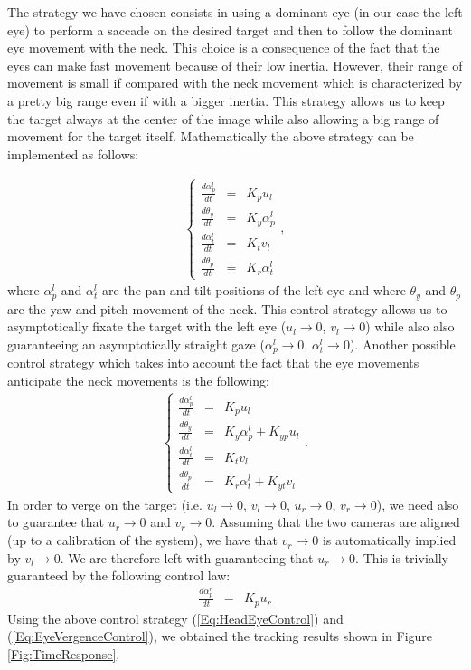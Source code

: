 The strategy we have chosen consists in using a dominant eye (in our case the left eye) to perform a saccade on the desired target and then to follow the dominant eye movement with the neck. This choice is a consequence of the fact that the eyes can make fast movement because of their low inertia. However, their range of movement is small if compared with the neck movement which is characterized by a pretty big range even if with a bigger inertia. This strategy allows us to keep the target always at the center of the image while also allowing a big range of movement for the target itself. Mathematically the above strategy can be implemented as follows:

\begin{eqnarray} 
\left\{ \begin{matrix}
\frac{d \alpha_p^l}{ d t} &=&   K_p u_l\\
\frac{d \theta_y}{ d t} &=&   K_y \alpha_p^l \\
\frac{d \alpha_t^l} {d t} &=&   K_t v_l\\
\frac{d \theta_p} {d t} &=&   K_r \alpha_t^l
\end{matrix} \right.,
\end{eqnarray}
where $\alpha_p^l$ and $\alpha_t^l$ are the pan and tilt positions of the left eye and where $\theta_y$ and $\theta_p$ are the yaw and pitch movement of the neck. This control strategy allows us to asymptotically fixate the target with the left eye ($u_l \rightarrow 0$, $v_l \rightarrow 0$) while also also guaranteeing an asymptotically  straight gaze ($\alpha_p^l \rightarrow 0$, $\alpha_t^l \rightarrow 0$). Another possible control strategy which takes into account the fact that the eye movements anticipate the neck movements is the following:
\begin{eqnarray} \label{Eq:HeadEyeControl}
\left\{ \begin{matrix}
\frac{d \alpha_p^l}{ d t} &=&   K_p u_l\\
\frac{d \theta_y}{ d t} &=&   K_y \alpha_p^l + K_{yp} u_l\\
\frac{d \alpha_t^l} {d t} &=&   K_t v_l\\
\frac{d \theta_p} {d t} &=&   K_r \alpha_t^l + K_{yt} v_l
\end{matrix} \right. .
\end{eqnarray}
In order to verge on the target (i.e. $u_l \rightarrow 0$, $v_l \rightarrow 0$, $u_r \rightarrow 0$, $v_r \rightarrow 0$), we need also to guarantee that $u_r \rightarrow 0$ and $v_r \rightarrow 0$. Assuming that the two cameras are aligned (up to a calibration of the system), we have that $v_r \rightarrow 0$ is automatically implied by $v_l \rightarrow 0$. We are therefore left with guaranteeing that $u_r \rightarrow 0$. This is trivially guaranteed by the following control law:
\begin{eqnarray} \label{Eq:EyeVergenceControl}
\frac{d \alpha_p^r}{ d t} &=&   K_p u_r
\end{eqnarray}
Using the above control strategy (\ref{Eq:HeadEyeControl}) and (\ref{Eq:EyeVergenceControl}),  we obtained the tracking results shown in Figure \ref{Fig:TimeResponse}.

